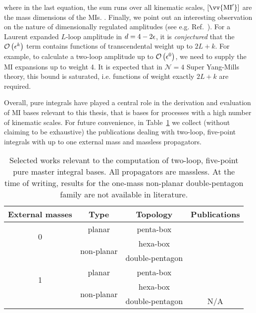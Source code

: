 \documentclass[main.tex]{subfiles}
\begin{document}
where in the last equation, the sum runs over all kinematic scales, $[\vv{\text{MI}'}]$ are the mass dimensions of the MIs. . Finally, we point out an interesting observation on the nature of dimensionally regulated amplitudes (see e.g. Ref.~\cite{Duhr:2014woa}). For a Laurent expanded $L$-loop amplitude in $d = 4- 2\epsilon$, it is \textit{conjectured} that the $\mathcal{O}\left(\epsilon^k\right)$ term contains functions of transcendental weight up to $2L+k$. For example, to calculate a two-loop amplitude up to $\mathcal{O}\left(\epsilon^0\right)$, we need to supply the MI expansions up to weight 4. It is expected that in $\mathcal{N}=4$ Super Yang-Mills theory, this bound is saturated, i.e. functions of weight exactly $2L+k$ are required.

Overall, pure integrals have played a central role in the derivation and evaluation of MI bases relevant to this thesis, that is bases for processes with a high number of kinematic scales. For future convenience, in Table~\ref{tab:MIs} we collect (without claiming to be exhaustive) the publications dealing with two-loop, five-point integrals with up to one external mass and massless propagators.
\begin{table}[b]
	\begin{center}
		\begin{tabular}{|c|c|c|c|}
            \hline
            External masses & Type & Topology & Publications \\
			\hline
            \multirow{2}{0cm}{0} & planar & penta-box & \cite{Gehrmann:2015bfy,Papadopoulos:2015jft, Gehrmann:2018yef, Abreu:2018aqd, Chicherin:2020oor} \\
            \cline{2-4}
            & \multirow{2}{2cm}{non-planar} & hexa-box & \cite{Chicherin:2018mue, Chicherin:2017dob, Chicherin:2018ubl, Chicherin:2018wes, Abreu:2018rcw, Chicherin:2020oor, Abreu:2018aqd} \\
            & & double-pentagon & \cite{Chicherin:2018old, Abreu:2018aqd, Chicherin:2020oor} \\
            \hline
            \multirow{2}{0cm}{1} & planar & penta-box & \cite{Abreu:2020jxa, Chicherin:2021dyp, Canko:2020ylt} \\
            \cline{2-4}
            & \multirow{2}{2cm}{non-planar} & hexa-box & \cite{abreu2021twoloop, Kardos:2022tpo, Papadopoulos:2019iam, Chicherin:2021dyp} \\
            & & double-pentagon & N/A \\
            \hline
		\end{tabular}
\end{center}
\caption{Selected works relevant to the computation of two-loop, five-point pure master integral bases. All propagators are massless. At the time of writing, results for the one-mass non-planar double-pentagon family are not available in literature.}
\label{tab:MIs}
\end{table}
\end{document}
